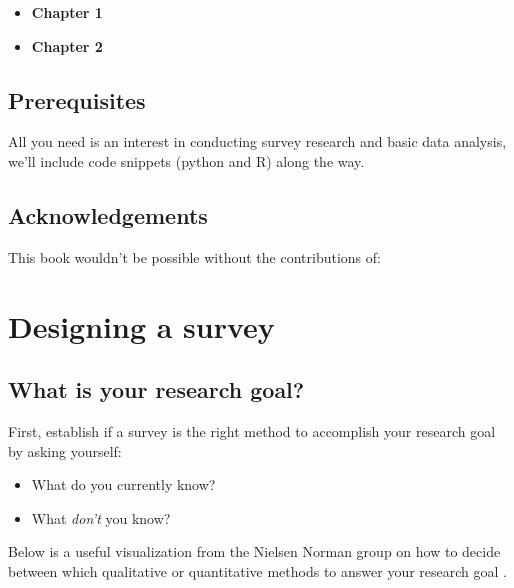 \documentclass[]{book}
\providecommand{\tightlist}{%
  \setlength{\itemsep}{0pt}\setlength{\parskip}{0pt}}
\begin{document}
\begin{itemize}
\tightlist
\item
  \textbf{Chapter 1}
\item
  \textbf{Chapter 2}
\end{itemize}

\section*{Prerequisites}\label{prerequisites}

All you need is an interest in conducting survey research and basic data
analysis, we'll include code snippets (python and R) along the way.

\section*{Acknowledgements}\label{acknowledgements}

This book wouldn't be possible without the contributions of:

\chapter{Designing a survey}\label{macro}

\section{What is your research goal?}\label{what-is-your-research-goal}

First, establish if a survey is the right method to accomplish your
research goal by asking yourself:

\begin{itemize}
\tightlist
\item
  What do you currently know?
\item
  What \emph{don't} you know?
\end{itemize}

Below is a useful visualization from the Nielsen Norman group on how to
decide between which qualitative or quantitative methods to answer your
research goal \citep{nng_method}.
\end{document}
